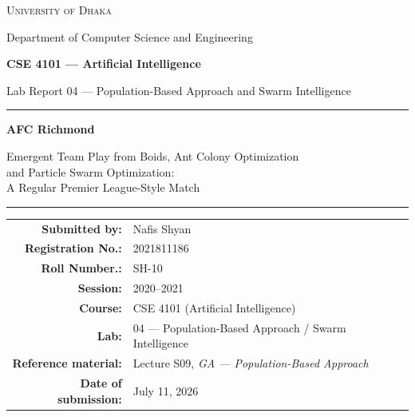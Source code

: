 \documentclass[11pt,a4paper]{article}
\begin{document}
\begin{titlepage}
\centering
\vspace*{1.2cm}
{\Large\scshape University of Dhaka\par}
{\large Department of Computer Science and Engineering\par}
\vspace{1.4cm}
{\large\bfseries CSE 4101 --- Artificial Intelligence\par}
{\large Lab Report 04 --- Population-Based Approach and Swarm Intelligence\par}
\vspace{1.8cm}
\rule{\linewidth}{0.8pt}\par\vspace{0.6cm}
{\Huge\bfseries AFC Richmond\par}
\vspace{0.4cm}
{\Large Emergent Team Play from Boids, Ant Colony Optimization\\
and Particle Swarm Optimization:\\[2mm]
A Regular Premier League-Style Match\par}
\vspace{0.6cm}
\rule{\linewidth}{0.8pt}\par
\vspace{2.0cm}
\begin{tabular}{rl}
\textbf{Submitted by:} & Nafis Shyan \\
\textbf{Registration No.:} & 2021811186\\
\textbf{Roll Number.:} & SH-10\\
\textbf{Session:} & 2020--2021 \\[3mm]
\textbf{Course:} & CSE 4101 (Artificial Intelligence) \\
\textbf{Lab:} & 04 --- Population-Based Approach / Swarm Intelligence \\
\textbf{Reference material:} & Lecture S09, \emph{GA --- Population-Based Approach} \\[3mm]
\textbf{Date of submission:} & July 11, 2026 \\
\end{tabular}
\vfill
\end{titlepage}
\end{document}
